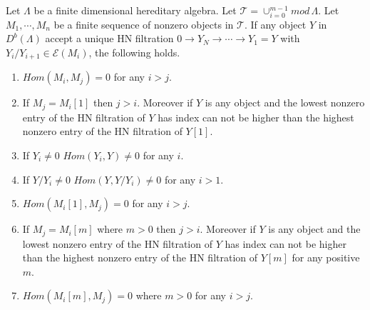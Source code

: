 \begin{lemma}\label{lem:C3L2}
Let $\Lambda$ be a finite dimensional hereditary algebra. Let $\mathcal{T} = \cup_{i=0}^{m-1} mod\,\Lambda$. Let $M_1,\cdots, M_n$ be a finite sequence of nonzero objects in $\mathcal{T}$. If any object $Y$ in $D^b(\Lambda)$ accept a unique HN filtration $0\to Y_N\to\cdots\to Y_1=Y$ with $Y_i/Y_{i+1}\in \mathcal{E}(M_i)$, the following holds.
\begin{enumerate}
\item $Hom(M_i,M_j) = 0$ for any $i>j$.
\item If $M_j = M_i[1]$ then $j>i$. Moreover if $Y$ is any object and the lowest nonzero entry of the HN filtration of $Y$ has index can not be higher than the highest nonzero entry of the HN filtration of $Y[1]$. 
\item If $Y_i\neq 0$ $Hom(Y_i, Y)\neq 0$ for any $i$.
\item If $Y/Y_i\neq 0$ $Hom(Y, Y/Y_i)\neq 0$ for any $i>1$.
\item $Hom(M_i[1],M_j) = 0$ for any $i>j$.
\item If $M_j = M_i[m]$ where $m>0$ then $j>i$. Moreover if $Y$ is any object and the lowest nonzero entry of the HN filtration of $Y$ has index can not be higher than the highest nonzero entry of the HN filtration of $Y[m]$ for any positive $m$. 
\item $Hom(M_i[m],M_j) = 0$ where $m>0$ for any $i>j$.
\end{enumerate}
\end{lemma}
